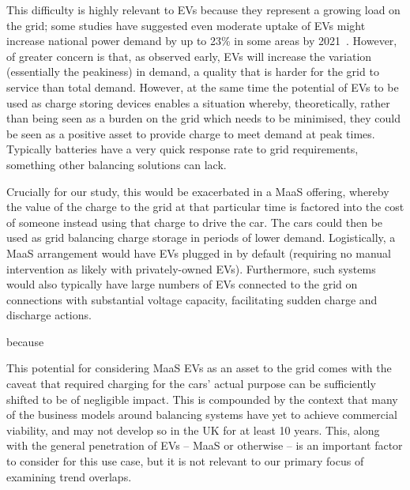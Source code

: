 \documentclass[b5paper,10pt]{article}
\begin{document}
This difficulty is highly relevant to EVs because they represent a
growing load on the grid; some studies have suggested even moderate
uptake of EVs might increase national power demand by up to 23\% in
some areas by 2021~\citep{paffumi-et-al:2015}. However, of greater
concern is that, as observed early, EVs will increase the variation
(essentially the peakiness) in demand, a quality that is harder for
the grid to service than total demand. However, at the same time the
potential of EVs to be used as charge storing devices enables a
situation whereby, theoretically, rather than being seen as a burden
on the grid which needs to be minimised, they could be seen as a
positive asset to provide charge to meet demand at peak
times. Typically batteries have a very quick response rate to grid
requirements, something other balancing solutions can lack.

Crucially for our study, this would be exacerbated in a MaaS offering,
whereby the value of the charge to the grid at that particular time is
factored into the cost of someone instead using that charge to drive
the car. The cars could then be used as grid balancing charge storage
in periods of lower demand. Logistically, a MaaS arrangement would
have EVs plugged in by default (requiring no manual intervention as
likely with privately-owned EVs). Furthermore, such systems would also
typically have large numbers of EVs connected to the grid on
connections with substantial voltage capacity, facilitating sudden
charge and discharge actions.

because %

This potential for considering MaaS EVs as an asset to the grid comes
with the caveat that required charging for the cars' actual purpose
can be sufficiently shifted to be of negligible impact. This is
compounded by the context that many of the business models around
balancing systems have yet to achieve commercial viability, and may
not develop so in the UK for at least 10 years. This, along with the
general penetration of EVs -- MaaS or otherwise -- is an important
factor to consider for this use case, but it is not relevant to our
primary focus of examining trend overlaps.

\end{document}
